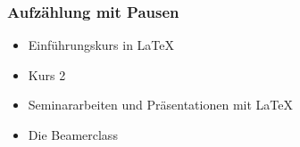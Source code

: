 \documentclass{beamer}
\begin{document}
%	






\begin{frame}\frametitle{Aufz\"ahlung mit Pausen}
\begin{itemize}
\item  Einf\"uhrungskurs in \LaTeX 
\item  Kurs 2 \pause 
\item  Seminararbeiten und Pr\"asentationen mit \LaTeX \pause 
\item  Die Beamerclass
\end{itemize} 
\end{frame}
\end{document}
